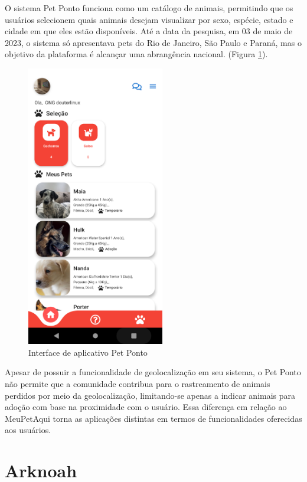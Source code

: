 O sistema Pet Ponto funciona como um catálogo de animais, permitindo que os usuários selecionem quais animais desejam visualizar por sexo, espécie, estado e cidade em que eles estão disponíveis. Até a data da pesquisa, em 03 de maio de 2023, o sistema só apresentava pets do Rio de Janeiro, São Paulo e Paraná, mas o objetivo da plataforma é alcançar uma abrangência nacional. (Figura \ref{fig:Pet Ponto}).

\begin{figure}[htb]
     \centering
     \includegraphics[width=6cm]{arquivos/Figuras/image20.png}
     \caption{Interface de aplicativo Pet Ponto}
     \label{fig:Pet Ponto}
\end{figure}
\newpage
Apesar de possuir a funcionalidade de geolocalização em seu sistema, o Pet Ponto não permite que a comunidade contribua para o rastreamento de animais perdidos por meio da geolocalização, limitando-se apenas a indicar animais para adoção com base na proximidade com o usuário. Essa diferença em relação ao MeuPetAqui torna as aplicações distintas em termos de funcionalidades oferecidas aos usuários.
\section{Arknoah}

